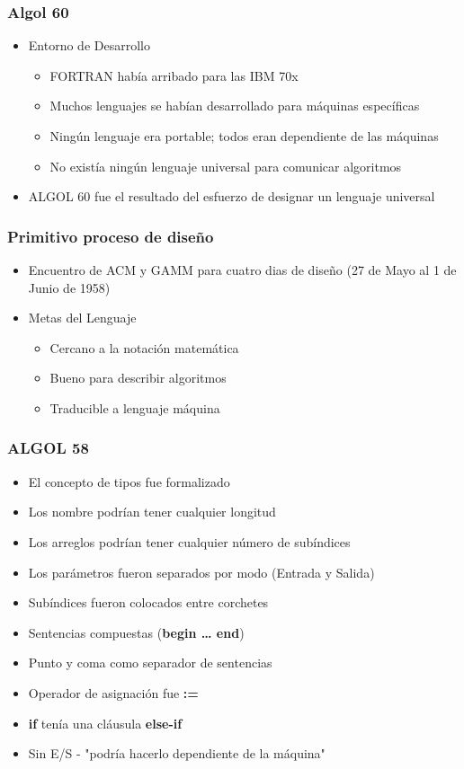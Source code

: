 \documentclass[11pt]{article}
\begin{document}
\subsubsection*{Algol 60}
\label{sec:orgheadline55}
\begin{itemize}
\item Entorno de Desarrollo
\begin{itemize}
\item FORTRAN había arribado para las IBM 70x
\item Muchos lenguajes se habían desarrollado para máquinas específicas
\item Ningún lenguaje era portable; todos eran dependiente de las máquinas
\item No existía ningún lenguaje universal para comunicar algoritmos
\end{itemize}
\item ALGOL 60 fue el resultado del esfuerzo de designar un lenguaje universal
\end{itemize}

\subsubsection*{Primitivo proceso de diseño}
\label{sec:orgheadline56}
\begin{itemize}
\item Encuentro de ACM y GAMM para cuatro dias de diseño (27 de Mayo al 1
de Junio de 1958)
\item Metas del Lenguaje
\begin{itemize}
\item Cercano a la notación matemática
\item Bueno para describir algoritmos
\item Traducible a lenguaje máquina
\end{itemize}
\end{itemize}

\subsubsection*{ALGOL 58}
\label{sec:orgheadline57}
\begin{itemize}
\item El concepto de tipos fue formalizado
\item Los nombre podrían tener cualquier longitud
\item Los arreglos podrían tener cualquier número de subíndices
\item Los parámetros fueron separados por modo (Entrada y Salida)
\item Subíndices fueron colocados entre corchetes
\item Sentencias compuestas (\textbf{begin \ldots{} end})
\item Punto y coma como separador de sentencias
\item Operador de asignación fue \textbf{:=}
\item \textbf{if} tenía una cláusula \textbf{else-if}
\item Sin E/S - "podría hacerlo dependiente de la máquina"
\end{itemize}
\end{document}
